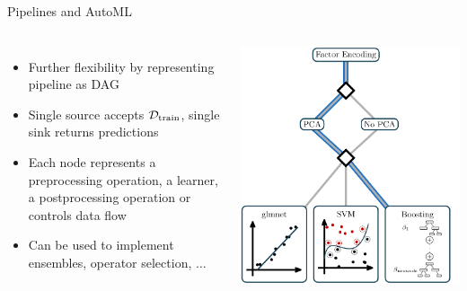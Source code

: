 \begin{vbframe}{Pipelines and AutoML}
\begin{columns}
\begin{itemize}
    \item Further flexibility by representing pipeline as DAG
    \item Single source accepts $\mathcal{D}_{\text{train}}$, single sink returns predictions
    \item Each node represents a preprocessing operation, a learner, a postprocessing operation or controls data flow
    \item Can be used to implement ensembles, operator selection, $\ldots$
\end{itemize}
\begin{center}
\includegraphics[width = \textwidth]{figure_man/pipeline_with_param_table_I.png}
\end{center}
\end{columns}
\end{vbframe}

